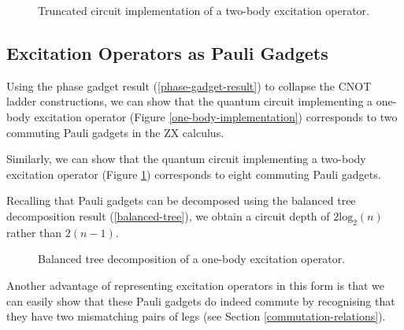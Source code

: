 \begin{figure}[H]
    \centering
    \caption{Truncated circuit implementation of a two-body excitation operator.}
    \label{two-body-implementation}
\end{figure}

\subsection{Excitation Operators as Pauli Gadgets}%
\label{excitation-operators-pauli-gadgets}

Using the phase gadget result (\ref{phase-gadget-result}) to collapse the CNOT ladder constructions, we can show that the quantum circuit implementing a one-body excitation operator (Figure \ref{one-body-implementation}) corresponds to two commuting Pauli gadgets in the ZX calculus.



Similarly, we can show that the quantum circuit implementing a two-body excitation operator (Figure \ref{two-body-implementation}) corresponds to eight commuting Pauli gadgets.


Recalling that Pauli gadgets can be decomposed using the balanced tree decomposition result (\ref{balanced-tree}), we obtain a circuit depth of $2\text{log}_2(n)$ rather than $2(n-1)$.

\begin{figure}[H]
    \centering
    \caption{Balanced tree decomposition of a one-body excitation operator.}
\end{figure}

Another advantage of representing excitation operators in this form is that we can easily show that these Pauli gadgets do indeed commute by recognising that they have two mismatching pairs of legs (see Section \ref{commutation-relations}).


